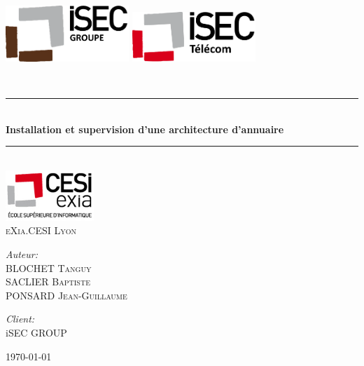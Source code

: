 \newcommand{\HRule}{\rule{\linewidth}{0.5mm}}


\begin{titlepage}
\begin{center}

\includegraphics[width=0.35\textwidth]{img/Logo-groupe.png}
\hspace{5cm}
\includegraphics[width=0.35\textwidth]{img/Logo-telecom.png}~\\[1cm]
\vspace{1cm}


\textsc{\Large }\\[0.5cm]

\HRule \\[0.4cm]

{\huge \bfseries
Installation et supervision d'une architecture d'annuaire \\[0.4cm] }

\HRule \\[2cm]
\includegraphics[width=0.25\textwidth]{img/logo_exia.jpg}~\\[1cm]
\textsc{\LARGE eXia.CESI Lyon}\\[1.5cm]

\vspace{2.5cm}

\begin{minipage}{0.5\textwidth}
\begin{flushleft} \large
\emph{Auteur:}\\
BLOCHET \textsc{Tanguy}\\
SACLIER \textsc{Baptiste}\\
PONSARD \textsc{Jean-Guillaume}
\end{flushleft}
\end{minipage}
\begin{minipage}{0.4\textwidth}
\begin{flushright} \large
\emph{Client:} \\
iSEC \textsc{GROUP}
\end{flushright}
\end{minipage}

\vfill

{\large \today}

\end{center}
\end{titlepage}

\newpage
~
\thispagestyle{empty}
\newpage

\tableofcontents
\thispagestyle{empty}
\setcounter{page}{0}

\renewcommand{\arraystretch}{1.5}

~
\thispagestyle{empty}
\setcounter{page}{0}
\newpage